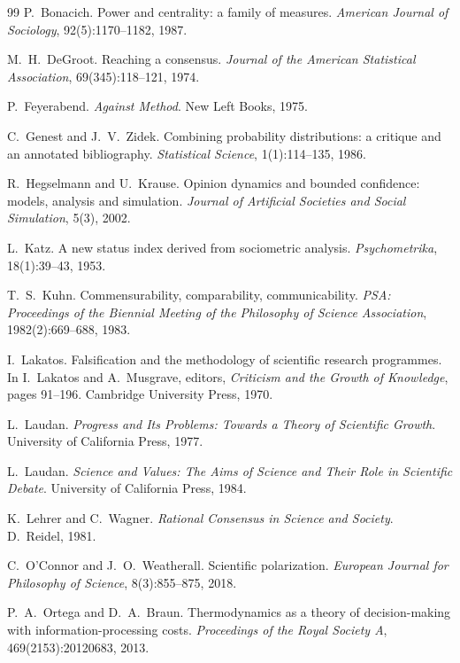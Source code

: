 \documentclass[runningheads]{llncs}
\begin{document}
\begin{thebibliography}{99}
P.~Bonacich.
Power and centrality: a family of measures.
\emph{American Journal of Sociology}, 92(5):1170--1182, 1987.

M.~H.~DeGroot.
Reaching a consensus. \emph{Journal of the American Statistical Association}, 69(345):118--121, 1974.

P.~Feyerabend.
\emph{Against Method}. New Left Books, 1975.

C.~Genest and J.~V.~Zidek.
Combining probability distributions: a critique and an annotated bibliography.
\emph{Statistical Science}, 1(1):114--135, 1986.

R.~Hegselmann and U.~Krause.
Opinion dynamics and bounded confidence: models, analysis and simulation.
\emph{Journal of Artificial Societies and Social Simulation}, 5(3), 2002.

L.~Katz.
A new status index derived from sociometric analysis. \emph{Psychometrika}, 18(1):39--43, 1953.

T.~S.~Kuhn.
Commensurability, comparability, communicability.
\emph{PSA: Proceedings of the Biennial Meeting of the Philosophy of Science Association},
1982(2):669--688, 1983.

I.~Lakatos.
Falsification and the methodology of scientific research programmes.
In I.~Lakatos and A.~Musgrave, editors, \emph{Criticism and the Growth of Knowledge},
pages 91--196. Cambridge University Press, 1970.

L.~Laudan.
\emph{Progress and Its Problems: Towards a Theory of Scientific Growth}.
University of California Press, 1977.

L.~Laudan.
\emph{Science and Values: The Aims of Science and Their Role in Scientific Debate}.
University of California Press, 1984.

K.~Lehrer and C.~Wagner.
\emph{Rational Consensus in Science and Society}. D.~Reidel, 1981.

C.~O'Connor and J.~O.~Weatherall.
Scientific polarization. \emph{European Journal for Philosophy of Science}, 8(3):855--875, 2018.

P.~A.~Ortega and D.~A.~Braun.
Thermodynamics as a theory of decision-making with information-processing costs.
\emph{Proceedings of the Royal Society A}, 469(2153):20120683, 2013.


\end{thebibliography}
\end{document}
